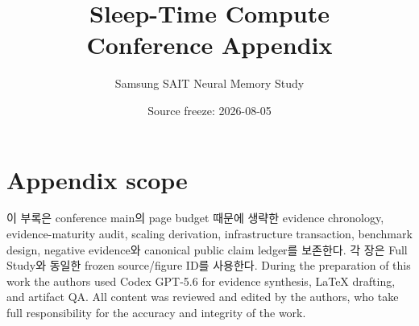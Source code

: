 \documentclass[10pt,a4paper,oneside,openany]{book}
\title{Sleep-Time Compute\\Conference Appendix}
\author{Samsung SAIT Neural Memory Study}
\date{Source freeze: 2026-08-05}
\begin{document}
\frontmatter
\maketitle
\chapter*{Appendix scope}
이 부록은 conference main의 page budget 때문에 생략한 evidence chronology, evidence-maturity audit,
scaling derivation, infrastructure transaction, benchmark design, negative evidence와 canonical public claim
ledger를 보존한다. 각 장은 Full Study와 동일한 frozen source/figure ID를 사용한다.
During the preparation of this work the authors used Codex GPT-5.6 for evidence synthesis, LaTeX drafting,
and artifact QA. All content was reviewed and edited by the authors, who take full responsibility for the
accuracy and integrity of the work.
\tableofcontents

\mainmatter







\appendix


\backmatter
\printbibliography[heading=bibintoc,title={참고문헌}]
\end{document}
